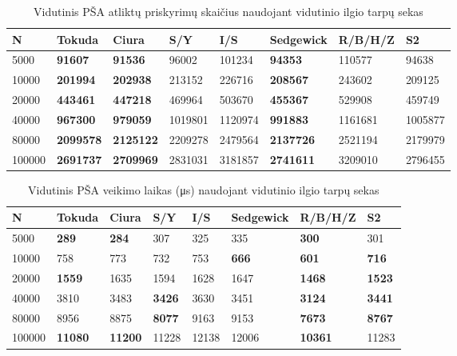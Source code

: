 \documentclass{VUMIFInfKursinis}
\begin{document}
\begin{table}[H]
  \caption{Vidutinis PŠA atliktų priskyrimų skaičius naudojant vidutinio ilgio tarpų sekas}
  \label{iss_medium_assignments}
  \begin{tabular}{|l|l|l|l|l|l|l|l|}
  \hline
  N      & Tokuda           & Ciura            & S/Y     & I/S     & Sedgewick        & R/B/H/Z & S2      \\ \hline
  5000   & \textbf{91607}   & \textbf{91536}   & 96002   & 101234  & \textbf{94353}   & 110577  & 94638   \\ \hline
  10000  & \textbf{201994}  & \textbf{202938}  & 213152  & 226716  & \textbf{208567}  & 243602  & 209125  \\ \hline
  20000  & \textbf{443461}  & \textbf{447218}  & 469964  & 503670  & \textbf{455367}  & 529908  & 459749  \\ \hline
  40000  & \textbf{967300}  & \textbf{979059}  & 1019801 & 1120974 & \textbf{991883}  & 1161681 & 1005877 \\ \hline
  80000  & \textbf{2099578} & \textbf{2125122} & 2209278 & 2479564 & \textbf{2137726} & 2521194 & 2179979 \\ \hline
  100000 & \textbf{2691737} & \textbf{2709969} & 2831031 & 3181857 & \textbf{2741611} & 3209010 & 2796455 \\ \hline
  \end{tabular}
\end{table}

\begin{table}[H]
  \caption{Vidutinis PŠA veikimo laikas (μs) naudojant vidutinio ilgio tarpų sekas}
  \label{iss_medium_runtimes}
  \begin{tabular}{|l|l|l|l|l|l|l|l|}
  \hline
  N      & Tokuda         & Ciura          & S/Y           & I/S   & Sedgewick    & R/B/H/Z        & S2            \\ \hline
  5000   & \textbf{289}   & \textbf{284}   & 307           & 325   & 335          & \textbf{300}   & 301           \\ \hline
  10000  & 758            & 773            & 732           & 753   & \textbf{666} & \textbf{601}   & \textbf{716}  \\ \hline
  20000  & \textbf{1559}  & 1635           & 1594          & 1628  & 1647         & \textbf{1468}  & \textbf{1523} \\ \hline
  40000  & 3810           & 3483           & \textbf{3426} & 3630  & 3451         & \textbf{3124}  & \textbf{3441} \\ \hline
  80000  & 8956           & 8875           & \textbf{8077} & 9163  & 9153         & \textbf{7673}  & \textbf{8767} \\ \hline
  100000 & \textbf{11080} & \textbf{11200} & 11228         & 12138 & 12006        & \textbf{10361} & 11283         \\ \hline
  \end{tabular}
\end{table}
\end{document}
